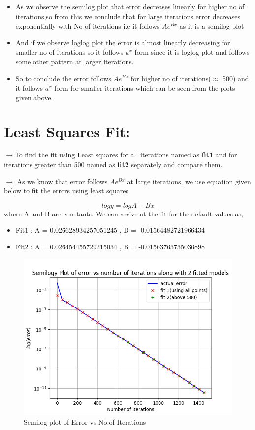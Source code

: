 \documentclass{article}
\begin{document}
 \begin{itemize}
 \item
   As we observe the semilog plot that error decreases linearly for higher
   no of iterations,so from this we conclude that for large iterations
   error decreases exponentially with No of iterations i.e it follows
   \(Ae^{Bx}\) as it is a semilog plot
 \item
   And if we observe loglog plot the error is almost linearly decreasing
   for smaller no of iterations so it follows \(a^x\) form since it is
   loglog plot and follows some other pattern at larger iterations.
 \item
   So to conclude the error follows \(Ae^{Bx}\) for higher no of
   iterations(\(\approx\) 500) and it follows \(a^x\) form for smaller
   iterations which can be seen from the plots given above.
 \end{itemize}
 
\section{Least Squares Fit:}

$\rightarrow$To find the fit using Least squares for all iterations named as
  \textbf{fit1} and for iterations greater than 500 named as \textbf{fit2}
  separately and compare them.

 $\rightarrow$ As we know that error follows \(Ae^{Bx}\) at large iterations, we use
  equation given below to fit the errors using least squares

\begin{equation}
    logy = logA + Bx
\end{equation}
where A and B are constants.\newline
We can arrive at the fit for the default values as,
\begin{itemize}
\item  
Fit1 : A = 0.026628934257051245 , B = -0.01564482721966434
\item
Fit2 : A = 0.026454455729215034 , B = -0.01563763735036898
\end{itemize}
\begin{figure}[!tbh]
 \centering
 \includegraphics[scale=0.8]{semilog2.png}  
 \caption{Semilog plot of Error vs No.of Iterations}
\end{figure}
\end{document}
